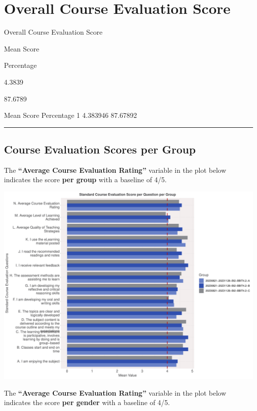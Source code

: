 \documentclass[
]{article}
\begin{document}
\section{Overall Course Evaluation
Score}\label{overall-course-evaluation-score}

Overall Course Evaluation Score

Mean Score

Percentage

4.3839

87.6789

Mean Score Percentage 1 4.383946 87.67892

\begin{center}\rule{0.5\linewidth}{0.5pt}\end{center}

\subsection{Course Evaluation Scores per
Group}\label{course-evaluation-scores-per-group}

The \textbf{``Average Course Evaluation Rating''} variable in the plot
below indicates the score \textbf{per group} with a baseline of 4/5.

\includegraphics{AnalysisOfCourseEvaluation-Notebook_files/figure-latex/VisualizationsForCourseEvaluationResultsperClassGroup-1.pdf}

The \textbf{``Average Course Evaluation Rating''} variable in the plot
below indicates the score \textbf{per gender} with a baseline of 4/5.
\end{document}
